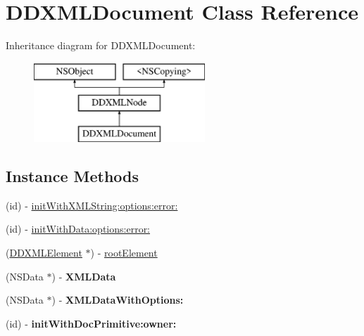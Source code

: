 \hypertarget{interface_d_d_x_m_l_document}{}\section{D\+D\+X\+M\+L\+Document Class Reference}
\label{interface_d_d_x_m_l_document}
Inheritance diagram for D\+D\+X\+M\+L\+Document\+:\begin{figure}[H]
\begin{center}
\leavevmode
\includegraphics[height=3.000000cm]{interface_d_d_x_m_l_document}
\end{center}
\end{figure}
\subsection*{Instance Methods}
\begin{DoxyCompactItemize}
\item 
(id) -\/ \hyperlink{interface_d_d_x_m_l_document_a1333963c4716f6fa3242ced4cdc8dee9}{init\+With\+X\+M\+L\+String\+:options\+:error\+:}
\item 
(id) -\/ \hyperlink{interface_d_d_x_m_l_document_ada1a30f2955d3dd07ece93ef8ce6ed5e}{init\+With\+Data\+:options\+:error\+:}
\item 
(\hyperlink{interface_d_d_x_m_l_element}{D\+D\+X\+M\+L\+Element} $\ast$) -\/ \hyperlink{interface_d_d_x_m_l_document_adccca136208b099d33b1e78e4d8ffd57}{root\+Element}
\item 
\hypertarget{interface_d_d_x_m_l_document_a4971dd75b69a275c86d0750b667e1487}{}(N\+S\+Data $\ast$) -\/ {\bfseries X\+M\+L\+Data}\label{interface_d_d_x_m_l_document_a4971dd75b69a275c86d0750b667e1487}

\item 
\hypertarget{interface_d_d_x_m_l_document_a84be93c9f946b0d449bc762bb24f7c58}{}(N\+S\+Data $\ast$) -\/ {\bfseries X\+M\+L\+Data\+With\+Options\+:}\label{interface_d_d_x_m_l_document_a84be93c9f946b0d449bc762bb24f7c58}

\item 
\hypertarget{interface_d_d_x_m_l_document_a569fafe1eaeddd4731cc8b56142a012e}{}(id) -\/ {\bfseries init\+With\+Doc\+Primitive\+:owner\+:}\label{interface_d_d_x_m_l_document_a569fafe1eaeddd4731cc8b56142a012e}

\end{DoxyCompactItemize}

